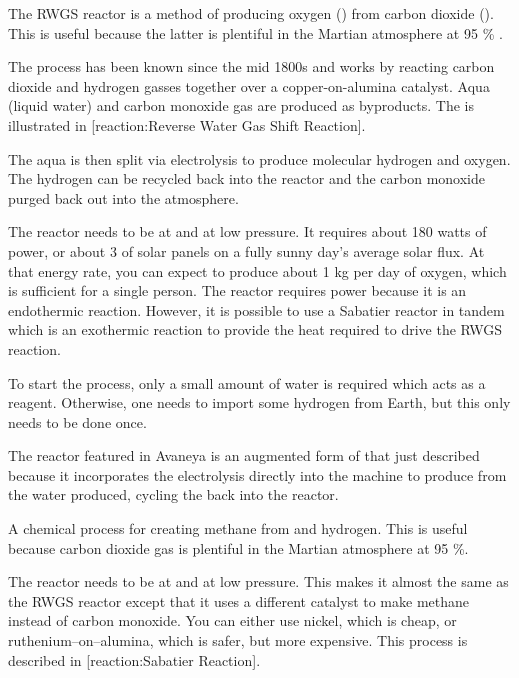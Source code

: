 The RWGS reactor is a method of producing oxygen () from carbon dioxide (). This is useful because the latter is plentiful in the Martian atmosphere at 95 \% .

\startformula
{}
\stopformula

The process has been known since the mid 1800s and works by reacting carbon dioxide and hydrogen gasses together over a copper-on-alumina catalyst. Aqua (liquid water) and carbon monoxide gas are produced as byproducts. The is illustrated in [reaction:Reverse Water Gas Shift Reaction].

The aqua is then split via electrolysis to produce molecular hydrogen and oxygen. The hydrogen can be recycled back into the reactor and the carbon monoxide purged back out into the atmosphere.

The reactor needs to be at  and at low pressure. It requires about 180 watts of power, or about 3  of solar panels on a fully sunny day's average solar flux. At that energy rate, you can expect to produce about 1 kg per day of oxygen, which is sufficient for a single person. The reactor requires power because it is an endothermic reaction. However, it is possible to use a Sabatier reactor in tandem which is an exothermic reaction to provide the heat required to drive the RWGS reaction.

To start the process, only a small amount of water is required which acts as a reagent. Otherwise, one needs to import some hydrogen from Earth, but this only needs to be done once.

The reactor featured in Avaneya is an augmented form of that just described because it incorporates the electrolysis directly into the machine to produce  from the water produced, cycling the  back into the reactor.

A chemical process for creating methane  from  and hydrogen. This is useful because carbon dioxide gas is plentiful in the Martian atmosphere at 95 \%.

\startformula
{}
\stopformula

The reactor needs to be at  and at low pressure. This makes it almost the same as the RWGS reactor except that it uses a different catalyst to make methane instead of carbon monoxide. You can either use nickel, which is cheap, or ruthenium--on--alumina, which is safer, but more expensive. This process is described in [reaction:Sabatier Reaction].


